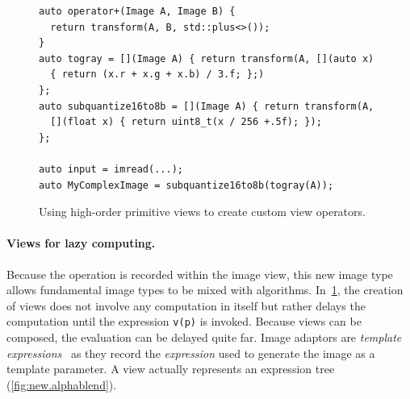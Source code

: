 \begin{figure}
  \begin{verbatim}
auto operator+(Image A, Image B) {
  return transform(A, B, std::plus<>());
}
auto togray = [](Image A) { return transform(A, [](auto x)
  { return (x.r + x.g + x.b) / 3.f; };)
};
auto subquantize16to8b = [](Image A) { return transform(A,
  [](float x) { return uint8_t(x / 256 +.5f); });
};

auto input = imread(...);
auto MyComplexImage = subquantize16to8b(togray(A));
  \end{verbatim}

  \caption{Using high-order primitive views to create custom view operators.}
  \label{fig:view.highorder}
\end{figure}

\paragraph{Views for lazy computing.} Because the operation is recorded within the image view, this new image type
allows fundamental image types to be mixed with algorithms. In~\cref{fig:view.highorder}, the creation of views does not
involve any computation in itself but rather delays the computation until the expression \texttt{v(p)} is invoked.
Because views can be composed, the evaluation can be delayed quite far. Image adaptors are \emph{template
  expressions}~\parencite{veldhuizen.1995.expression,veldhuizen.2000.blitz} as they record the \emph{expression} used to
generate the image as a template parameter. A view actually represents an expression tree (\cref{fig:new.alphablend}).

